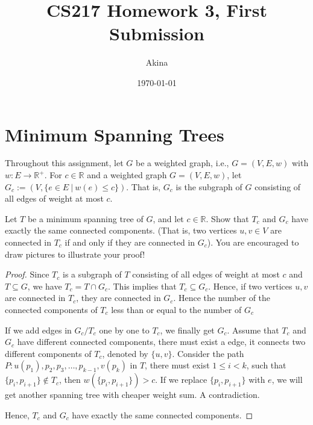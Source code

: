 \documentclass[11pt,a4paper,oneside]{article}
\newcommand{\R}{\mathbb{R}}
\renewcommand{\hwtitle} {CS217 Homework 3, First Submission}
\renewcommand{\hwauthor}{Akina}
\renewcommand{\hwdate}{\today}
\begin{document}
\title{\hwtitle}
\author{\hwauthor}
\date{\hwdate}
\maketitle

\section*{Minimum Spanning Trees}

Throughout this assignment, let $G$ be a weighted graph, i.e., $G=(V,E,w)$ 
with $w: E \rightarrow \R^+$.
For $c \in \R$ and a weighted graph $G = (V,E,w)$, let
$G_c := (V, \{e \in E \ | \ w(e) \leq c\})$. That is, $G_c$ is the
subgraph of $G$ consisting of all edges of weight at most $c$.

\begin{problem}{1}
	\statement
	Let $T$ be a minimum spanning tree of $G$, and let $c \in \R$.  Show that
	$T_c$ and $G_c$ have exactly the same connected components.  (That
	is, two vertices $u,v \in V$ are connected in $T_c$ if and only if
	they are connected in $G_c$).
	You are encouraged to draw pictures to illustrate your proof!
	\solution
	
	\begin{proof}
		Since \(T_c\) is a subgraph of \(T\) consisting of all edges of weight at most \(c\) and \(T \subseteq G\), we have  \(T_c = T \cap G_c\). This implies that \(T_c \subseteq G_c\). Hence, if two vertices \(u, v\) are connected in \(T_c\), they are connected in \(G_c\). Hence the number of the connected components of \(T_c\) less than or equal to the number of \(G_c\)
		
		If we add edges in \(G_c / T_c\) one by one to \(T_c\), we finally get \(G_c\). Assume that \(T_c\) and \(G_c\) have different connected components, there must exist a edge, it connects two different components of \(T_c\), denoted by \(\{u, v\}\). Consider the path \(P: u(p_1), p_2, p_3, \dots, p_{k-1}, v(p_k)\) in \(T\), there must exist \(1 \leq i < k\), such that \(\{p_i, p_{i+1} \} \not\in T_c\), then \(w(\{p_i, p_{i+1}\}) > c\). If we replace \(\{p_i, p_{i+1}\}\) with \(e\), we will get another spanning tree with cheaper weight sum. A contradiction.
		
		Hence, \(T_c\) and \(G_c\) have exactly the same connected components.
	\end{proof}
\end{problem}
\end{document}
